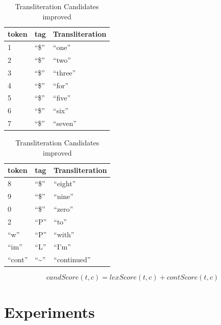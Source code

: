 \documentclass[preprint,review,12pt]{elsarticle}
\begin{document}
\begin{table}[ht]
  \begin{minipage}[c]{0.5\linewidth}
    \begin{tabular}[l]{lll}
    \hline
    token & tag & Transliteration \\
    \hline
    1 & ``\$'' & ``one'' \\
    2 & ``\$'' & ``two'' \\
    3 & ``\$'' & ``three'' \\
    4 & ``\$'' & ``for'' \\
    5 & ``\$'' & ``five'' \\
    6 & ``\$'' & ``six'' \\
    7 & ``\$'' & ``seven'' \\
    \hline
  \end{tabular}
\end{minipage}
  \begin{minipage}[c]{0.5\linewidth}
    \begin{tabular}[l]{lll}
    \hline
    token & tag & Transliteration \\
    \hline
    8 & ``\$'' & ``eight'' \\
    9 & ``\$'' & ``nine'' \\
    0 & ``\$'' & ``zero'' \\
    2 & ``P''  & ``to'' \\
    ``w'' & ``P''  & ``with'' \\
    ``im'' & ``L''  & ``I'm'' \\
    ``cont'' & ``\textasciitilde''  & ``continued'' \\
    \hline
  \end{tabular}
  \end{minipage}
  \caption{Transliteration Candidates improved}
\label{tab:transliteral}
\end{table}




\begin{equation}
candScore(t,c) = lexScore(t,c) + contScore(t,c)
\label{eq:candscore}
\end{equation}

\section{Experiments}
\label{sec:experiments}
\end{document}
